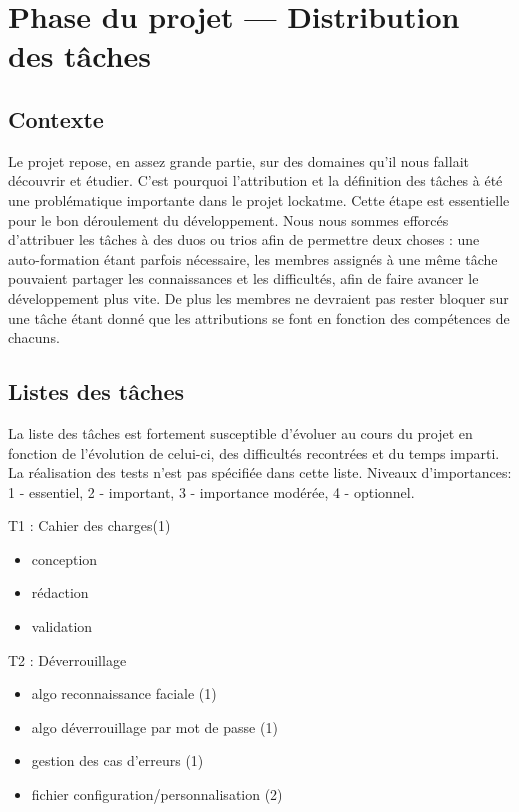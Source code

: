 \chapter{Phase du projet --- Distribution des tâches}
\section{Contexte}
Le projet repose, en assez grande partie, sur des domaines qu’il nous
fallait découvrir et étudier. C’est pourquoi l’attribution et la définition
des tâches à été une problématique importante dans le projet lockatme.
Cette étape est essentielle pour le bon déroulement du développement.
Nous nous sommes efforcés d’attribuer les tâches à des duos ou trios afin de
permettre deux choses : une auto-formation étant parfois nécessaire, les
membres assignés à une même tâche pouvaient partager les connaissances et les
difficultés, afin de faire avancer le développement plus vite. De plus les
membres ne devraient pas rester bloquer sur une tâche étant donné que les
attributions se font en fonction des compétences de chacuns.

\section{Listes des tâches}
La liste des tâches est fortement susceptible d’évoluer au cours du projet en
fonction de l’évolution de celui-ci, des difficultés recontrées et du temps
imparti. La réalisation des tests n’est pas spécifiée dans cette liste.
Niveaux d’importances: 1 - essentiel, 2 - important, 3 - importance modérée,
4 - optionnel.

\vspace{0.5cm}

T1 : Cahier des charges(1)
\begin{itemize}
  \item{conception}
  \item{rédaction}
  \item{validation}
\end{itemize}

T2 : Déverrouillage
\begin{itemize}
  \item{algo reconnaissance faciale (1)}
  \item{algo déverrouillage par mot de passe (1)}
  \item{gestion des cas d’erreurs (1)}
  \item{fichier configuration/personnalisation (2)}
\end{itemize}

